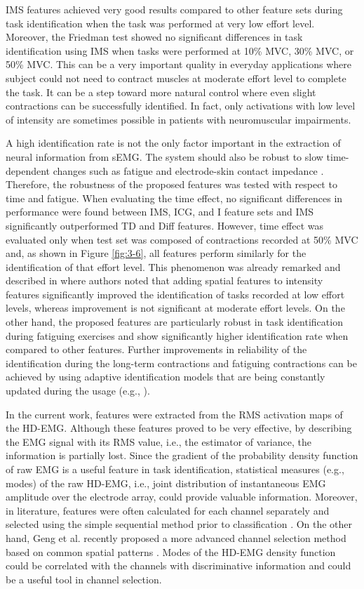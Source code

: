 IMS features achieved very good results compared to other feature sets during task identification when the task was performed at very low effort level. Moreover, the Friedman test showed no significant differences in task identification using IMS when tasks were performed at 10\% MVC, 30\% MVC, or 50\% MVC. This can be a very important quality in everyday applications where subject could not need to contract muscles at moderate effort level to complete the task. It can be a step toward more natural control where even slight contractions can be successfully identified. In fact, only activations with low level of intensity are sometimes possible in patients with neuromuscular impairments.

A high identification rate is not the only factor important in the extraction of neural information from sEMG. The system should also be robust to slow time-dependent changes such as fatigue and electrode-skin contact impedance \citep{Farina2014}. Therefore, the robustness of the proposed features was tested with respect to time and fatigue. When evaluating the time effect, no significant differences in performance were found between IMS, ICG, and I feature sets and IMS significantly outperformed TD and Diff features. However, time effect was evaluated only when test set was composed of contractions recorded at 50\% MVC and, as shown in Figure \ref{fig:3-6}, all features perform similarly for the identification of that effort level. This phenomenon was already remarked and described in \citep{Jordanic2016a} where authors noted that adding spatial features to intensity features significantly improved the identification of tasks recorded at low effort levels, whereas improvement is not significant at moderate effort levels. On the other hand, the proposed features are particularly robust in task identification during fatiguing exercises and show significantly higher identification rate when compared to other features. Further improvements in reliability of the identification during the long-term contractions and fatiguing contractions can be achieved by using adaptive identification models that are being constantly updated during the usage (e.g., \citep{Vidovic2016, Hahne2015, Sensinger2009}).

In the current work, features were extracted from the RMS activation maps of the HD-EMG. Although these features proved to be very effective, by describing the EMG signal with its RMS value, i.e., the estimator of variance, the information is partially lost. Since the gradient of the probability density function of raw EMG is a useful feature in task identification, statistical measures (e.g., modes) of the raw HD-EMG, i.e., joint distribution of instantaneous EMG amplitude over the electrode array, could provide valuable information. Moreover, in literature, features were often calculated for each channel separately and selected using the simple sequential method prior to classification \citep{Hargrove2009, Li2017}. On the other hand, Geng et al. recently proposed a more advanced channel selection method based on common spatial patterns \citep{Geng2014}. Modes of the HD-EMG density function could be correlated with the channels with discriminative information and could be a useful tool in channel selection.

